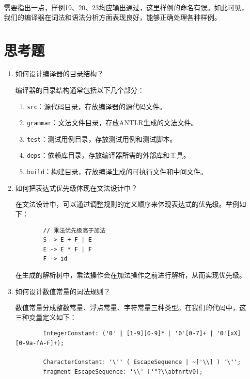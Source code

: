 \documentclass[UTF8]{report}
\begin{document}
需要指出一点，样例19、20、23均应输出通过，这里样例的命名有误。如此可见，我们的编译器在词法和语法分析方面表现良好，能够正确处理各种样例。

\section{思考题}

\begin{enumerate}
    \item 如何设计编译器的目录结构？
    
    编译器的目录结构通常包括以下几个部分：
    \begin{enumerate}
        \item \texttt{src}：源代码目录，存放编译器的源代码文件。
        \item \texttt{grammar}：文法文件目录，存放ANTLR生成的文法文件。
        \item \texttt{test}：测试用例目录，存放测试用例和测试脚本。
        \item \texttt{deps}：依赖库目录，存放编译器所需的外部库和工具。
        \item \texttt{build}：构建目录，存放编译生成的可执行文件和中间文件。
    \end{enumerate}

    \item 如何把表达式优先级体现在文法设计中？
    
    在文法设计中，可以通过调整规则的定义顺序来体现表达式的优先级。举例如下：

    \begin{lstlisting}
        // 乘法优先级高于加法
        S -> E + F | E
        E -> E * F | F
        F -> id
    \end{lstlisting}

    在生成的解析树中，乘法操作会在加法操作之前进行解析，从而实现优先级。

    \item 如何设计数值常量的词法规则？
    
    数值常量分成整数常量、浮点常量、字符常量三种类型。在我们的代码中，这三种变量定义如下：

    \begin{lstlisting}
        IntegerConstant: ('0' | [1-9][0-9]* | '0'[0-7]+ | '0'[xX][0-9a-fA-F]+);

        CharacterConstant: '\'' ( EscapeSequence | ~['\\] ) '\'';
        fragment EscapeSequence: '\\' ['"?\\abfnrtv0];


\end{lstlisting}
\end{enumerate}
\end{document}
